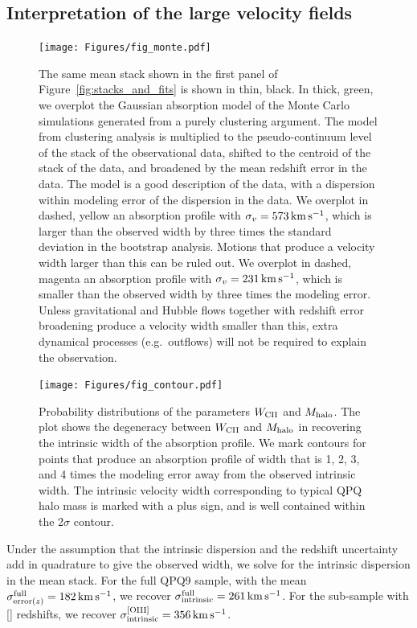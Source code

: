 \documentclass[iop]{emulateapj}
\begin{document}
\subsection{Interpretation of the large velocity fields}
\label{sec:significance_width}

\begin{figure}
\texttt{[image: Figures/fig\_monte.pdf]}
\caption{The same  mean stack shown in the first panel of 
Figure~\ref{fig:stacks_and_fits} is shown in thin, black. In thick, green, we overplot the 
Gaussian absorption model of the Monte Carlo simulations generated from a purely clustering 
argument. The model from clustering analysis is multiplied to the pseudo-continuum level of the 
stack of the observational data, shifted to the centroid of the stack of the data, and broadened 
by the mean redshift error in the data. The model is a good description of the data, with a 
dispersion within modeling error of the dispersion in the data. We overplot in dashed, yellow an 
absorption profile with $\sigma_v=573\,{\rm km\,s^{-1}}$, which is larger than the observed width 
by three times the standard deviation in the bootstrap analysis. Motions that produce a velocity 
width larger than this can be ruled out. We overplot in dashed, magenta an absorption profile with 
$\sigma_v=231\,{\rm km\,s^{-1}}$, which is smaller than the observed width by three times the 
modeling error. Unless gravitational and Hubble flows together with redshift error broadening 
produce a velocity width smaller than this, extra dynamical processes (e.g.\ outflows) will not be 
required to explain the observation. 
}
\label{fig:monte}
\end{figure}

\begin{figure}
\texttt{[image: Figures/fig\_contour.pdf]}
\caption{
Probability distributions of the parameters $W_{\rm CII}$ and $M_{\rm halo}$. The plot shows the 
degeneracy between $W_{\rm CII}$ and $M_{\rm halo}$ in recovering the intrinsic width of the 
absorption profile. We mark contours for points that produce an absorption 
profile of width that is 1, 2, 3, and 4 times the modeling error away from the observed intrinsic 
width. The intrinsic velocity width corresponding to typical QPQ halo mass is marked with a plus 
sign, and is well contained within the 2$\sigma$ contour.}
\label{fig:contour}
\end{figure}

Under the assumption that the intrinsic dispersion and the redshift uncertainty add in 
quadrature to give the observed width, we solve for the intrinsic dispersion in the  
mean stack. For the full QPQ9 sample, with the mean 
$\sigma_{{\rm error}(z)}^{\rm full}=182\,{\rm km\,s^{-1}}$, we recover 
$\sigma_{\rm intrinsic}^{\rm full}=261\,{\rm km\,s^{-1}}$. For the sub-sample with [] 
redshifts, we recover $\sigma_{\rm intrinsic}^{\rm [OIII]}=356\,{\rm km\,s^{-1}}$. 
\end{document}
